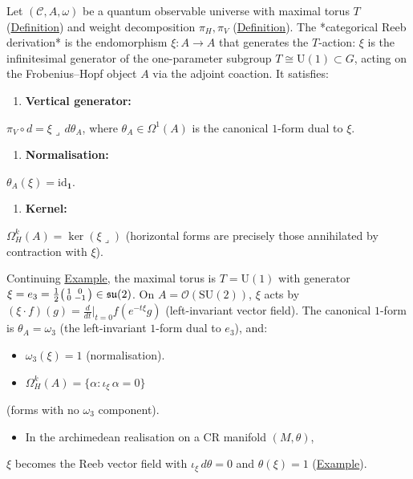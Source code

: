 \begin{definition}
  \label{def:categorical-reeb}
Let $(\mathcal{C}, A, \omega)$ be a quantum observable universe with
maximal torus $T$ (\hyperref[def:maximal-torus]{Definition}) and weight
decomposition $\pi_H, \pi_V$
(\hyperref[def:weight-decomposition]{Definition}). The *categorical
Reeb derivation* is the endomorphism $\xi \colon A \to A$ that
generates the $T$-action: $\xi$ is the infinitesimal generator of the
one-parameter subgroup $T \cong \mathrm{U}(1) \subset G$, acting on
the Frobenius--Hopf object $A$ via the adjoint coaction. It satisfies:

\begin{enumerate}
  \item \textbf{Vertical generator:}
\end{enumerate}
   $\pi_V \circ d = \xi \lrcorner\, d\theta_A$, where
   $\theta_A \in \Omega^1(A)$ is the canonical $1$-form dual to $\xi$.
\begin{enumerate}
  \item \textbf{Normalisation:}
\end{enumerate}
   $\theta_A(\xi) = \mathrm{id}_{\mathbf{1}}$.
\begin{enumerate}
  \item \textbf{Kernel:}
\end{enumerate}
   $\Omega^k_H(A) = \ker(\xi \lrcorner)$ (horizontal forms are
   precisely those annihilated by contraction with $\xi$).
\end{definition}

\begin{example}
  \label{ex:reeb-su2}
Continuing \hyperref[ex:maximal-torus-su2]{Example}, the maximal torus is
$T = \mathrm{U}(1)$ with generator
$\xi = e_3 = \frac{1}{2}\begin{psmallmatrix} 1 & 0 \\ 0 & -1
\end{psmallmatrix} \in \mathfrak{su}(2)$.
On $A = \mathcal{O}(\mathrm{SU}(2))$, $\xi$ acts by
$(\xi \cdot f)(g) = \frac{d}{dt}\big|_{t=0} f(e^{-t\xi} g)$
(left-invariant vector field). The canonical $1$-form is
$\theta_A = \omega_3$ (the left-invariant $1$-form dual to $e_3$), and:

\begin{itemize}
  \item $\omega_3(\xi) = 1$ (normalisation).
  \item $\Omega^k_H(A) = \{\alpha : \iota_\xi\,\alpha = 0\}$
\end{itemize}
  (forms with no $\omega_3$ component).
\begin{itemize}
  \item In the archimedean realisation on a CR manifold $(M, \theta)$,
\end{itemize}
  $\xi$ becomes the Reeb vector field with $\iota_\xi\,d\theta = 0$
  and $\theta(\xi) = 1$
  (\hyperref[def:reeb-decomposition]{Example}).
\end{example}

